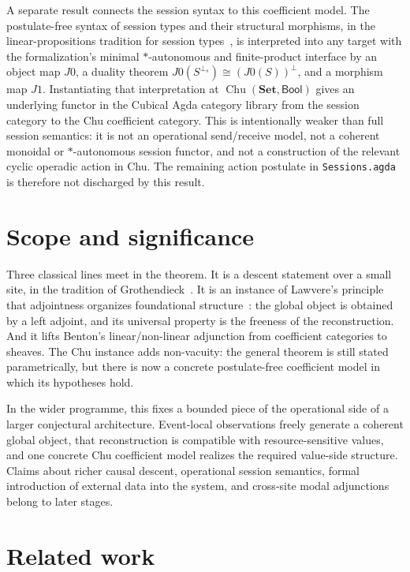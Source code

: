 \documentclass[11pt]{article}
\newcommand{\Set}{\mathbf{Set}}
\newcommand{\Bool}{\mathsf{Bool}}
\newcommand{\Chu}{\operatorname{Chu}}
\begin{document}
A separate result connects the session syntax to this coefficient model. The
postulate-free syntax of session types and their structural morphisms, in the
linear-propositions tradition for session types~\cite{CairesPfenning2010,Wadler2014},
is interpreted into any target with the formalization's minimal $*$-autonomous
and finite-product interface by an object map $J0$, a duality theorem
$J0(S^{\perp_s})\cong (J0(S))^\perp$, and a morphism map $J1$. Instantiating
that interpretation at $\Chu(\Set,\Bool)$ gives an underlying functor in the
Cubical Agda category library from the session category to the Chu coefficient
category. This is intentionally weaker than full session semantics: it is not an
operational send/receive model, not a coherent monoidal or $*$-autonomous
session functor, and not a construction of the relevant cyclic operadic action
in Chu. The remaining action postulate in \texttt{Sessions.agda} is therefore
not discharged by this result.

\section*{Scope and significance}

Three classical lines meet in the theorem. It is a descent statement over a
small site, in the tradition of Grothendieck~\cite{SGA4,MacLaneMoerdijk1992}.
It is an instance of Lawvere's principle that adjointness organizes
foundational structure~\cite{Lawvere1969}: the global object is obtained by a
left adjoint, and its universal property is the freeness of the reconstruction.
And it lifts Benton's linear/non-linear adjunction from coefficient categories
to sheaves. The Chu instance adds non-vacuity: the general theorem is still
stated parametrically, but there is now a concrete postulate-free coefficient
model in which its hypotheses hold.

In the wider programme, this fixes a bounded piece of the operational side of a
larger conjectural architecture. Event-local observations freely generate a
coherent global object, that reconstruction is compatible with
resource-sensitive values, and one concrete Chu coefficient model realizes the
required value-side structure. Claims about richer causal descent, operational
session semantics, formal introduction of external data into the system, and
cross-site modal adjunctions belong to later stages.

\section*{Related work}
\end{document}

